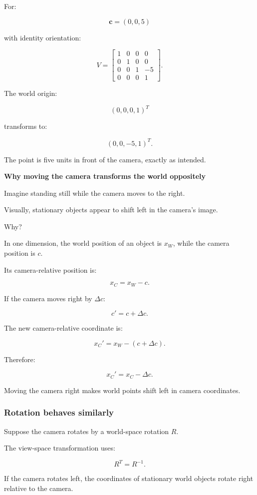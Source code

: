 For:

\[
 \mathbf c=(0,0,5)
\]

with identity orientation:

\[
 \boxed{ V= \begin{bmatrix} 1&0&0&0\\ 0&1&0&0\\ 0&0&1&-5\\ 0&0&0&1 \end{bmatrix} }.
\]

The world origin:

\[
 (0,0,0,1)^T
\]

transforms to:

\[
 \boxed{(0,0,-5,1)^T}.
\]

The point is five units in front of the camera, exactly as intended.

\textbf{Why moving the camera transforms the world oppositely}

Imagine standing still while the camera moves to the right.

Visually, stationary objects appear to shift left in the camera's image.

Why?

In one dimension, the world position of an object is \(x_W\), while the camera position is \(c\).

Its camera-relative position is:

\[
 \boxed{x_C=x_W-c}.
\]

If the camera moves right by \(\Delta c\):

\[
 c'=c+\Delta c.
\]

The new camera-relative coordinate is:

\[
 x_C'=x_W-(c+\Delta c).
\]

Therefore:

\[
 \boxed{x_C'=x_C-\Delta c}.
\]

Moving the camera right makes world points shift left in camera coordinates.

\subsubsection{Rotation behaves similarly}\label{rotation-behaves-similarly}

Suppose the camera rotates by a world-space rotation \(R\).

The view-space transformation uses:

\[
 R^T=R^{-1}.
\]

If the camera rotates left, the coordinates of stationary world objects rotate right relative to the camera.

